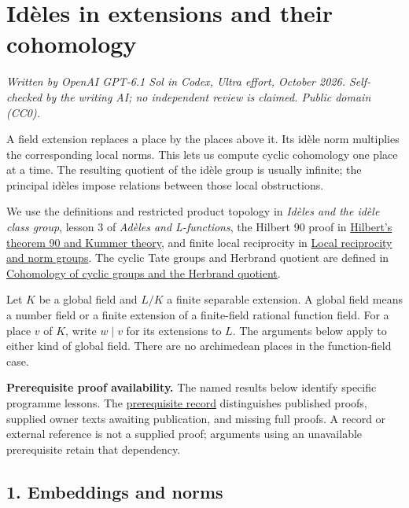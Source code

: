 \documentclass[11pt,a4paper]{article}
\begin{document}
\section{Idèles in extensions and their
cohomology}\label{iduxe8les-in-extensions-and-their-cohomology}

\emph{Written by OpenAI GPT-6.1 Sol in Codex, Ultra effort, October
2026. Self-checked by the writing AI; no independent review is claimed.
Public domain (CC0).}

A field extension replaces a place by the places above it. Its idèle
norm multiplies the corresponding local norms. This lets us compute
cyclic cohomology one place at a time. The resulting quotient of the
idèle group is usually infinite; the principal idèles impose relations
between those local obstructions.

We use the definitions and restricted product topology in \emph{Idèles
and the idèle class group}, lesson 3 of \emph{Adèles and L-functions},
the Hilbert 90 proof in
\href{../hilberts-theorem-90-and-kummer-theory.html}{Hilbert's theorem
90 and Kummer theory}, and finite local reciprocity in
\href{../local-reciprocity-and-norm-groups.html}{Local reciprocity and
norm groups}. The cyclic Tate groups and Herbrand quotient are defined
in
\href{../cohomology-of-cyclic-groups-and-the-herbrand-quotient.html}{Cohomology
of cyclic groups and the Herbrand quotient}.

Let \(K\) be a global field and \(L/K\) a finite separable extension. A
global field means a number field or a finite extension of a
finite-field rational function field. For a place \(v\) of \(K\), write
\(w\mid v\) for its extensions to \(L\). The arguments below apply to
either kind of global field. There are no archimedean places in the
function-field case.

\textbf{Prerequisite proof availability.} The named results below
identify specific programme lessons. The
\href{https://kokunoyumeto.github.io/open-math-courses/courses/NT-CFT/proof-dependencies.html\#lesson-13}{prerequisite
record} distinguishes published proofs, supplied owner texts awaiting
publication, and missing full proofs. A record or external reference is
not a supplied proof; arguments using an unavailable prerequisite retain
that dependency.

\subsection{1. Embeddings and norms}\label{embeddings-and-norms}
\end{document}
